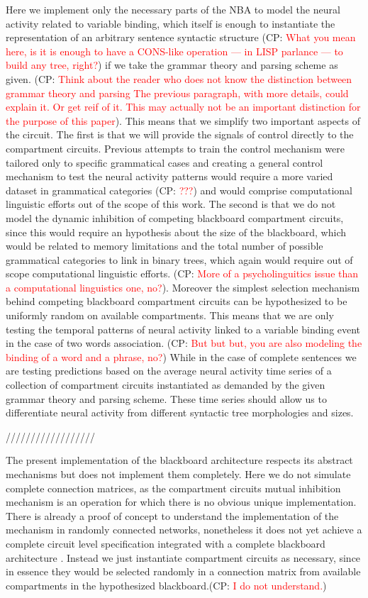 \documentclass[10pt]{article}
\newcommand{\noteCP}[1]{(CP: \textcolor{red}{#1})}
\begin{document}
Here we implement only the necessary parts of the NBA to model the neural activity related to variable binding, which itself is enough to instantiate the representation of an arbitrary sentence syntactic structure
\noteCP{What you mean here, is it is enough to have a CONS-like operation --- in LISP parlance --- to build any tree, right?}
if we take the grammar theory and parsing scheme as given.
\noteCP{Think about the reader who does not know the distinction between grammar theory and parsing The previous paragraph, with more details, could explain it. Or get reif of it. This may actually not be an important distinction for the purpose of this paper}.
This means that we simplify two important aspects of the circuit.
The first is that we will provide the signals of control directly to the compartment circuits.
Previous attempts to train the control mechanism\cite{van_der_Velde_2010} were tailored only to specific grammatical cases and creating a general control mechanism to test the neural activity patterns would require a more varied dataset in grammatical categories
\noteCP{???}
and would comprise computational linguistic efforts out of the scope of this work.
The second is that we do not model the dynamic inhibition of competing blackboard compartment circuits, since this would require an hypothesis about the size of the blackboard, which would be related to memory limitations and the total number of possible grammatical categories to link in binary trees, which again would require out of scope computational linguistic efforts.
\noteCP{More of a psycholinguitics issue than a computational linguistics one, no?}.
Moreover the simplest selection mechanism behind competing blackboard compartment circuits can be hypothesized to be uniformly random on available compartments.
This means that we are only testing the temporal patterns of neural activity linked to a variable binding event in the case of two words association.
\noteCP{But but but, you are also modeling the binding of a word and a phrase, no?}
While in the case of complete sentences we are testing predictions based on the average neural activity time series of a collection of compartment circuits instantiated as demanded by the given grammar theory and parsing scheme.
These time series should allow us to differentiate neural activity from different syntactic tree morphologies and sizes.


//////////////////


The present implementation of the blackboard architecture respects its
abstract mechanisms but does not implement them completely. Here we do
not simulate complete connection matrices, as the compartment circuits
mutual inhibition mechanism is an operation for which there is no
obvious unique implementation. There is already a proof of concept to
understand the implementation of the mechanism in randomly connected
networks, nonetheless it does not yet achieve a complete circuit level
specification integrated with a complete blackboard architecture
\cite{van_der_Velde_2011}. Instead we just instantiate compartment
circuits as necessary, since in essence they would be selected
randomly in a connection matrix from available compartments in the
hypothesized blackboard.\noteCP{I do not understand.}
\end{document}
